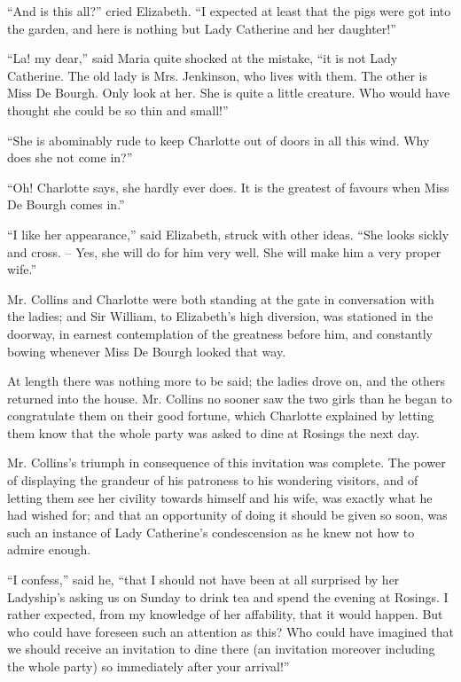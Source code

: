“And is this all?” cried Elizabeth. “I expected at
least that the pigs were got into the garden, and here is
nothing but Lady Catherine and her daughter!”

“La! my dear,” said Maria quite shocked at the
mistake, “it is not Lady Catherine. The old lady is
Mrs. Jenkinson, who lives with them. The other is Miss
De Bourgh. Only look at her. She is quite a little
creature. Who would have thought she could be so thin
and small!”

“She is abominably rude to keep Charlotte out of doors
in all this wind. Why does she not come in?”

“Oh! Charlotte says, she hardly ever does. It is the
greatest of favours when Miss De Bourgh comes in.”

“I like her appearance,” said Elizabeth, struck with
other ideas. “She looks sickly and cross. -- Yes, she will
do for him very well. She will make him a very proper
wife.”

Mr. Collins and Charlotte were both standing at the
gate in conversation with the ladies; and Sir William,
to Elizabeth’s high diversion, was stationed in the doorway,
in earnest contemplation of the greatness before
him, and constantly bowing whenever Miss De Bourgh
looked that way.

At length there was nothing more to be said; the
ladies drove on, and the others returned into the house.
Mr. Collins no sooner saw the two girls than he began
to congratulate them on their good fortune, which Charlotte
explained by letting them know that the whole
party was asked to dine at Rosings the next day.


Mr. Collins’s triumph in consequence of this invitation
was complete. The power of displaying the grandeur of
his patroness to his wondering visitors, and of letting them
see her civility towards himself and his wife, was exactly
what he had wished for; and that an opportunity of
doing it should be given so soon, was such an instance of
Lady Catherine’s condescension as he knew not how to
admire enough.

“I confess,” said he, “that I should not have been at
all surprised by her Ladyship’s asking us on Sunday to
drink tea and spend the evening at Rosings. I rather
expected, from my knowledge of her affability, that it
would happen. But who could have foreseen such an
attention as this? Who could have imagined that we
should receive an invitation to dine there (an invitation
moreover including the whole party) so immediately after
your arrival!”

